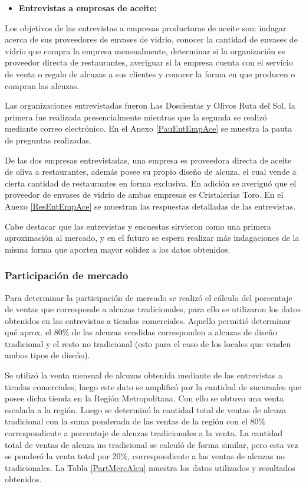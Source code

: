 \begin{itemize}
\item \textbf{Entrevistas a empresas de aceite:}
\end{itemize}

Los objetivos de las entrevistas a empresas productoras de aceite son: indagar acerca de sus proveedores de envases de vidrio, conocer la cantidad de envases de vidrio que compra la empresa mensualmente, determinar si la organización es proveedor directa de restaurantes, averiguar si la empresa cuenta con el servicio de venta o regalo de alcuzas a sus clientes y conocer la forma en que producen o compran las alcuzas.

Las organizaciones entrevistadas fueron Las Doscientas y Olivos Ruta del Sol, la primera fue realizada presencialmente mientras que la segunda se realizó mediante correo electrónico. En el Anexo \ref{PauEntEmpAce} se muestra la pauta de preguntas realizadas.

De las dos empresas entrevistadas, una empresa es proveedora directa de aceite de oliva a restaurantes, además posee su propio diseño de alcuza, el cual  vende a cierta cantidad de restaurantes en forma exclusiva. En adición se averiguó que el proveedor de envases de vidrio de ambas empresas es Cristalerías Toro. En el Anexo \ref{ResEntEmpAce} se muestran las respuestas detalladas de las entrevistas.

Cabe destacar que las entrevistas y encuestas sirvieron como una primera aproximación al mercado, y en el futuro se espera realizar más indagaciones de la misma forma que aporten mayor solidez a los datos obtenidos.

\subsubsection{ Participación de mercado}

Para determinar la participación de mercado se realizó el cálculo del porcentaje de ventas que corresponde a alcuzas tradicionales, para ello se utilizaron los datos obtenidos en las entrevistas a tiendas comerciales. Aquello permitió determinar qué aprox. el 80\% de las alcuzas vendidas corresponden a alcuzas de diseño tradicional y el resto no tradicional (esto para el caso de los locales que venden ambos tipos de diseño).

Se utilizó la venta mensual de alcuzas obtenida mediante de las entrevistas a tiendas comerciales, luego este dato se amplificó por la cantidad de sucursales que posee dicha tienda en la Región Metropolitana. Con ello se obtuvo una venta escalada a la región. Luego se determinó la cantidad total de ventas de alcuza tradicional con la suma ponderada de las ventas de la región con el 80\% correspondiente a porcentaje de alcuzas tradicionales a la venta. La cantidad total de ventas de alcuza no tradicional se calculó de forma similar, pero esta vez se ponderó la venta total por 20\%, correspondiente a las ventas de alcuzas no tradicionales. La Tabla \ref{PartMercAlcu} muestra los datos utilizados y resultados obtenidos.

